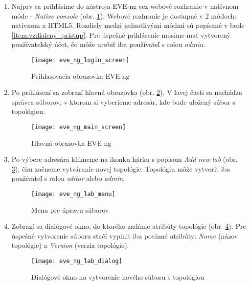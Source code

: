 \begin{enumerate}[noitemsep]

    \item \label{item:prihlasenie} Najprv sa prihlásime do nástroja EVE-ng cez webové rozhranie v natívnom móde - \emph{Native console} (obr. \ref{obr:eve_ng_login_screen}). Webové rozhranie je dostupné v 2 módoch: natívnom a HTML5. Rozdiely medzi jednotlivými módmi sú popísané v bode \ref{item:vzdialeny_pristup}. Pre úspešné prihlásenie musíme mať vytvorený používateľský účet, čo môže urobiť iba používateľ s rolou \emph{admin}.

\begin{figure}
    \centering
    \texttt{[image: eve\_ng\_login\_screen]}
    \caption{Prihlasovacia obrazovka EVE-ng}
    \label{obr:eve_ng_login_screen}
\end{figure}

    \item Po prihlásení sa zobrazí hlavná obrazovka (obr. \ref{obr:eve_ng_main_screen}). V ľavej časti sa nachádza správca súborov, v ktorom si vyberieme adresár, kde bude uložený súbor s topológiou.

\begin{figure}
    \centering
    \texttt{[image: eve\_ng\_main\_screen]}
    \caption{Hlavná obrazovka EVE-ng}
    \label{obr:eve_ng_main_screen}
\end{figure}

    \item Po výbere adresára klikneme na ikonku hárku s popisom \emph{Add new lab} (obr. \ref{obr:eve_ng_lab_menu}), čím začneme vytváranie novej topológie. Topológiu môže vytvoriť iba používateľ s rolou \emph{editor} alebo \emph{admin}.

\begin{figure}
    \centering
        \texttt{[image: eve\_ng\_lab\_menu]}
    \caption{Menu pre úpravu súborov}
    \label{obr:eve_ng_lab_menu}
\end{figure}

    \item Zobrazí sa dialógové okno, do ktorého zadáme atribúty topológie (obr. \ref{obr:eve_ng_lab_dialog}). Pre úspešné vytvorenie súboru stačí vyplniť iba povinné atribúty: \emph{Name} (názov topológie) a \emph{Version} (verzia topológie).

\begin{figure}
    \centering
    \texttt{[image: eve\_ng\_lab\_dialog]}
    \caption{Dialógové okno na vytvorenie nového súboru s topológiou}
    \label{obr:eve_ng_lab_dialog}
\end{figure}


\end{enumerate}
